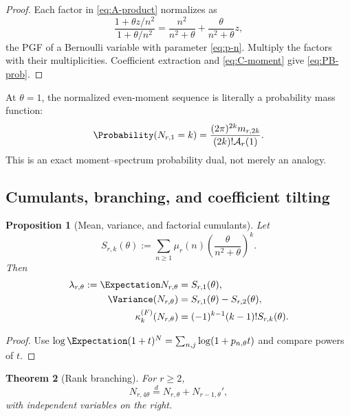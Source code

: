 \documentclass[11pt,oneside]{article}
\newtheorem{theorem}{Theorem}[section]
\newtheorem{proposition}[theorem]{Proposition}
\theoremstyle{definition}
\theoremstyle{remark}
\newcommand{\Ar}{\mathcal A}
\begin{document}
\begin{proof}
Each factor in \eqref{eq:A-product} normalizes as
\[
 \frac{1+\theta z/n^2}{1+\theta/n^2}
 =\frac{n^2}{n^2+\theta}+\frac{\theta}{n^2+\theta}z,
\]
the PGF of a Bernoulli variable with parameter \eqref{eq:p-n}.  Multiply the
factors with their multiplicities.  Coefficient extraction and
\eqref{eq:C-moment} give \eqref{eq:PB-prob}.
\end{proof}

At $\theta=1$, the normalized even-moment sequence is literally a probability
mass function:
\begin{equation}\label{eq:moment-pmf}
 \Probability(N_{r,1}=k)=
 \frac{(2\pi)^{2k}m_{r,2k}}{(2k)!\Ar_r(1)}.
\end{equation}
This is an exact moment--spectrum probability dual, not merely an analogy.

\subsection{Cumulants, branching, and coefficient tilting}

\begin{proposition}[Mean, variance, and factorial cumulants]\label{prop:PB-cumulants}
Let
\begin{equation}\label{eq:S-k}
 S_{r,k}(\theta):=\sum_{n\geq1}\mu_r(n)
 \left(\frac{\theta}{n^2+\theta}\right)^k.
\end{equation}
Then
\begin{align}
 \lambda_{r,\theta}:=\Expectation N_{r,\theta}&=S_{r,1}(\theta),\label{eq:PB-mean}\\
 \Variance(N_{r,\theta})&=S_{r,1}(\theta)-S_{r,2}(\theta),\label{eq:PB-var}\\
 \kappa_k^{(F)}(N_{r,\theta})
 &=(-1)^{k-1}(k-1)!S_{r,k}(\theta).\label{eq:PB-factorial}
\end{align}
\end{proposition}

\begin{proof}
Use $\log\Expectation(1+t)^N=\sum_{n,j}\log(1+p_{n,\theta}t)$ and compare powers of
$t$.
\end{proof}

\begin{theorem}[Rank branching]\label{thm:N-branching}
For $r\geq2$,
\begin{equation}\label{eq:N-branching}
 N_{r,4\theta}\stackrel d=N_{r,\theta}+N_{r-1,\theta}',
\end{equation}
with independent variables on the right.
\end{theorem}
\end{document}
